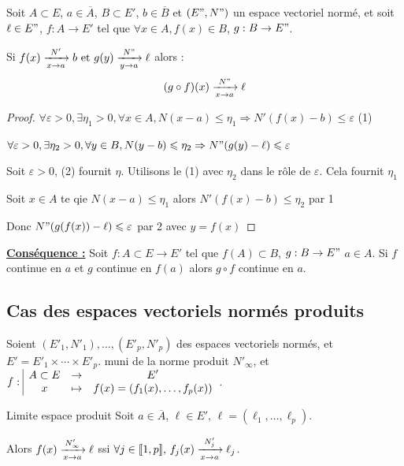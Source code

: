 \begin{proposition}{}{}
    Soit $A \subset E$, $a \in \overline A$, $B \subset E'$, $b \in \overline B$ et 
    $(E", N")$ un espace vectoriel normé, et soit $\ell \in E"$, $f : A \to E'$ tel que $\forall x \in A, f(x) \in B$, $g: B \to E"$. 

    Si $f(x) \limitnorme{N'}x a b \text{ et } g(y) \limitnorme{N"}y a \ell$ alors :
    \[(g \circ f )(x) \limitnorme{N"} x a \ell\]
\end{proposition}

\begin{proof}
    $\forall \varepsilon > 0, \exists \eta_1 > 0, \forall x \in A, N(x - a) \leqslant \eta_1 \Rightarrow N'(f(x) - b) \leqslant \varepsilon$ (1)

    $\forall \varepsilon > 0, \exists \eta_2 > 0, \forall y \in B, N(y - b) \leqslant \eta_2 \Rightarrow N"(g(y) - \ell) \leqslant \varepsilon$

    Soit $\varepsilon > 0$, (2) fournit $\eta$. Utilisons le (1) avec $\eta_2$ dans le rôle 
    de $\varepsilon$. Cela fournit $\eta_1$

    Soit $x \in A$ te qie $N(x - a) \leqslant \eta_1$ alors $N'(f(x) - b) \leqslant \eta_2$ par 1

    Donc $N"(g(f(x)) - \ell) \leqslant \varepsilon$ par 2 avec $y = f(x)$
\end{proof}

\textbf{\uline{Conséquence :}}
Soit $f : A \subset E \to E'$ tel que $f(A) \subset B$, $g : B \to E"$ $a \in A$. Si $f$ continue en $a$ et $g$ continue en $f(a)$ alors $g \circ f$ continue en $a$.

\subsection{Cas des espaces vectoriels normés produits}

Soient $(E'_1, N'_1), \ldots, (E'_p, N'_p)$ des espaces vectoriels normés, et $E' = E'_1 \times \cdots \times E'_p$.
muni de la norme produit $N'_\infty$, et $\fonction{f}{A\subset E}{E'}{x}{f(x) = (f_1(x), \ldots, f_p(x))}$.


\begin{proposition}{Limite espace produit}{}
    Soit $a \in \overline A$, $\ell \in E', \, \ell = (\ell_1, \ldots, \ell_p)$.

    Alors $f(x) \limitnorme{N'_\infty}{x}{a} \ell$ ssi $\forall j \in \ninter{1}{p}, \, f_j(x) \limitnorme{N'_j}{x}{a} \ell_j$.

\end{proposition}

